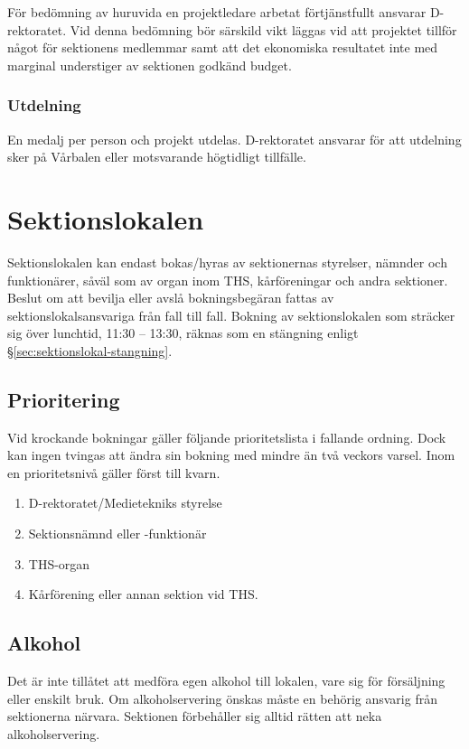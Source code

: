 \documentclass{dgovdoc}
\begin{document}
För bedömning av huruvida en projektledare arbetat förtjänstfullt ansvarar
D-rektoratet. Vid denna bedömning bör särskild vikt läggas vid att projektet
tillför något för sektionens medlemmar samt att det ekonomiska resultatet inte
med marginal understiger av sektionen godkänd budget.

\subsubsection{Utdelning}

En medalj per person och projekt utdelas. D-rektoratet ansvarar för att utdelning sker på Vårbalen eller motsvarande högtidligt tillfälle.

\section{Sektionslokalen}

Sektionslokalen kan endast bokas/hyras av sektionernas styrelser, nämnder och
funktionärer, såväl som av organ inom THS, kårföreningar och andra sektioner.
Beslut om att bevilja eller avslå bokningsbegäran fattas av
sektionslokalsansvariga från fall till fall. Bokning av sektionslokalen som
sträcker sig över lunchtid, 11:30 -- 13:30, räknas som en stängning enligt
\S\ref{sec:sektionslokal-stangning}.

\subsection{Prioritering}

Vid krockande bokningar gäller följande prioritetslista i fallande ordning.
Dock kan ingen tvingas att ändra sin bokning med mindre än två veckors varsel.
Inom en prioritetsnivå gäller först till kvarn.

\begin{enumerate}
  \item D-rektoratet/Medietekniks styrelse
  \item Sektionsnämnd eller -funktionär
  \item THS-organ
  \item Kårförening eller annan sektion vid THS.
\end{enumerate}

\subsection{Alkohol}

Det är inte tillåtet att medföra egen alkohol till lokalen, vare sig för
försäljning eller enskilt bruk. Om alkoholservering önskas måste en behörig
ansvarig från sektionerna närvara. Sektionen förbehåller sig alltid rätten att
neka alkoholservering.
\end{document}
